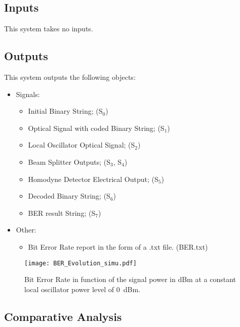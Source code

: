 \subsection*{Inputs}

This system takes no inputs.

\subsection*{Outputs}

This system outputs the following objects:
\begin{itemize}
\item Signals:
\begin{itemize}
\item Initial Binary String; (S$_0$)
\item Optical Signal with coded Binary String; (S$_{1}$)
\item Local Oscillator Optical Signal; (S$_{2}$)
\item Beam Splitter Outputs; (S$_{3}$, S$_{4}$)
\item Homodyne Detector Electrical Output; (S$_{5}$)
\item Decoded Binary String; (S$_{6}$)
\item BER result String; (S$_{7}$)
\end{itemize}
\item Other:
\begin{itemize}
\item Bit Error Rate report in the form of a .txt file. (BER.txt)
\end{itemize}
\end{itemize}

\begin{figure}[H]
\centering
\texttt{[image: BER\_Evolution\_simu.pdf]}
\caption{Bit Error Rate in function of the signal power in dBm at a constant local oscillator power level of 0~dBm.}
\label{fig:berevolution}
\end{figure}

\subsection{Comparative Analysis}

